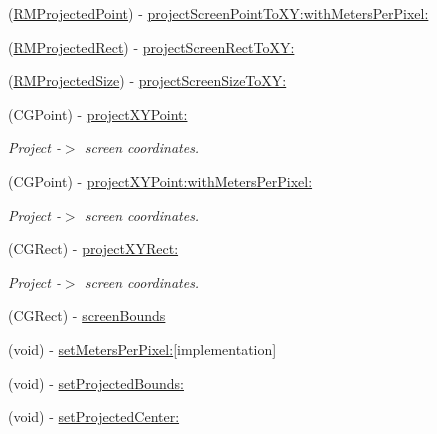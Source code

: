 \begin{DoxyCompactItemize}
\item 
(\hyperlink{struct_r_m_projected_point}{R\-M\-Projected\-Point}) -\/ \hyperlink{interface_r_m_mercator_to_screen_projection_ae4aca2604d100a8a16e04f70c7d7740e}{project\-Screen\-Point\-To\-X\-Y\-:with\-Meters\-Per\-Pixel\-:}
\item 
(\hyperlink{struct_r_m_projected_rect}{R\-M\-Projected\-Rect}) -\/ \hyperlink{interface_r_m_mercator_to_screen_projection_a52b275b603a3ce0ecae8d8126880252c}{project\-Screen\-Rect\-To\-X\-Y\-:}
\item 
(\hyperlink{struct_r_m_projected_size}{R\-M\-Projected\-Size}) -\/ \hyperlink{interface_r_m_mercator_to_screen_projection_a36883ed7966071c5f51a836c77a2f2da}{project\-Screen\-Size\-To\-X\-Y\-:}
\item 
(C\-G\-Point) -\/ \hyperlink{interface_r_m_mercator_to_screen_projection_a276efafa172d9221c5133d2308890c8f}{project\-X\-Y\-Point\-:}
\begin{DoxyCompactList}\small\item\em Project -\/$>$ screen coordinates. \end{DoxyCompactList}\item 
(C\-G\-Point) -\/ \hyperlink{interface_r_m_mercator_to_screen_projection_afbe204c10488ebc50a818d88d0017b16}{project\-X\-Y\-Point\-:with\-Meters\-Per\-Pixel\-:}
\begin{DoxyCompactList}\small\item\em Project -\/$>$ screen coordinates. \end{DoxyCompactList}\item 
(C\-G\-Rect) -\/ \hyperlink{interface_r_m_mercator_to_screen_projection_a1d5076b8f0b97d2b93a7d801c61f8ba4}{project\-X\-Y\-Rect\-:}
\begin{DoxyCompactList}\small\item\em Project -\/$>$ screen coordinates. \end{DoxyCompactList}\item 
(C\-G\-Rect) -\/ \hyperlink{interface_r_m_mercator_to_screen_projection_aebb472dbe94a24c62a612fa849732d39}{screen\-Bounds}
\item 
(void) -\/ \hyperlink{interface_r_m_mercator_to_screen_projection_ac8c6b2da4ecc190c768b4e30469b410b}{set\-Meters\-Per\-Pixel\-:}{\ttfamily  \mbox{[}implementation\mbox{]}}
\item 
(void) -\/ \hyperlink{interface_r_m_mercator_to_screen_projection_a0e7573981b462d019a879178840233f4}{set\-Projected\-Bounds\-:}
\item 
(void) -\/ \hyperlink{interface_r_m_mercator_to_screen_projection_a814a8a8ddbafeda6e68b8e02d2efcfb4}{set\-Projected\-Center\-:}

\end{DoxyCompactItemize}
